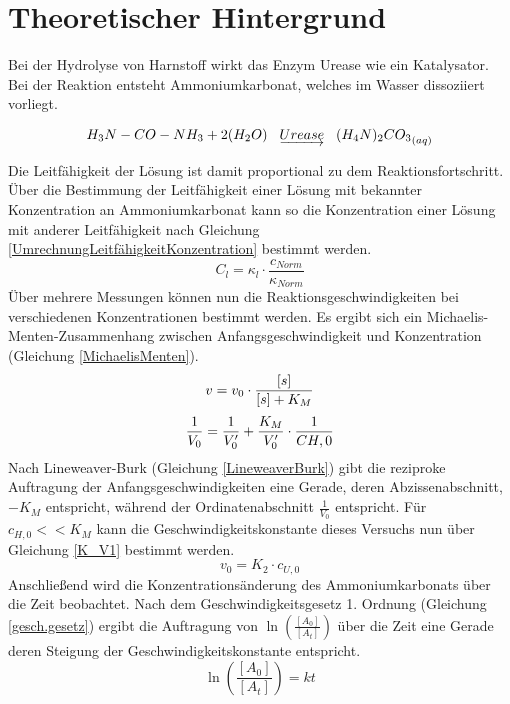 \section{Theoretischer Hintergrund}
Bei der Hydrolyse von Harnstoff wirkt das Enzym Urease wie ein Katalysator.
Bei der Reaktion entsteht Ammoniumkarbonat, welches im Wasser dissoziiert vorliegt.

$$ H_3N-CO-NH_3 + 2(H_2O) \hspace{3mm}\underrightarrow{Urease}\hspace{3mm} {(H_4N)_2CO_3}_{(aq)}$$

Die Leitfähigkeit der Lösung ist damit proportional zu dem Reaktionsfortschritt.
Über die Bestimmung der Leitfähigkeit einer Lösung mit bekannter Konzentration an Ammoniumkarbonat kann so die Konzentration einer Lösung mit anderer Leitfähigkeit nach Gleichung \ref{UmrechnungLeitfähigkeitKonzentration} bestimmt werden.
\begin{equation}
	C_l = \kappa_l\cdot \frac{c_{Norm}}{\kappa_{Norm}}
\label{UmrechnungLeitfähigkeitKonzentration}
\end{equation}
Über mehrere Messungen können nun die Reaktionsgeschwindigkeiten bei verschiedenen Konzentrationen bestimmt werden.
Es ergibt sich ein Michaelis-Menten-Zusammenhang zwischen Anfangsgeschwindigkeit und Konzentration (Gleichung \ref{MichaelisMenten}).
\begin{equation}
	v=v_0\cdot\frac{[s]}{[s]+K_M}
\label{MichaelisMenten}\\
\end{equation}
\begin{equation}
	\frac{1}{V_0} = \frac{1}{V'_0} + \frac{K_M}{V'_0}\cdot \frac{1}{C{H,0}}
\label{LineweaverBurk}\\
\end{equation}
Nach Lineweaver-Burk (Gleichung \ref{LineweaverBurk}) gibt die reziproke Auftragung der Anfangsgeschwindigkeiten eine Gerade, deren Abzissenabschnitt, $-K_M$ entspricht, während der Ordinatenabschnitt $\frac{1}{V_0}$ entspricht.
Für $c_{H,0} << K_M$ kann die Geschwindigkeitskonstante dieses Versuchs nun über Gleichung \ref{K_V1} bestimmt werden.
\begin{equation}
	v_0=K_2\cdot c_{U,0}
	\label{K_V1}
\end{equation}
Anschließend wird die Konzentrationsänderung des Ammoniumkarbonats über die Zeit beobachtet. 
Nach dem Geschwindigkeitsgesetz 1. Ordnung (Gleichung \ref{gesch.gesetz}) ergibt die Auftragung von $\ln\left(\frac{[A_0]}{[A_t]}\right)$ über die Zeit eine Gerade deren Steigung der Geschwindigkeitskonstante entspricht.
\begin{equation}
	\ln{\left(\frac{[A_0]}{[A_t]}\right)=kt}
\label{gesch.gesetz}
\end{equation}
